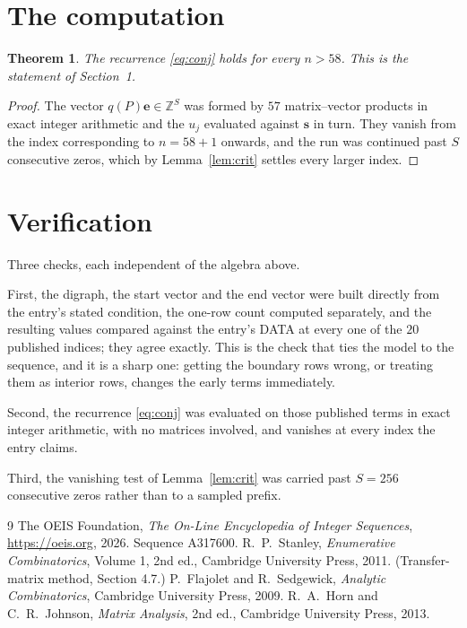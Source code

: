 \documentclass[11pt,a4paper]{article}
\theoremstyle{plain}
\newtheorem{theorem}{Theorem}
\theoremstyle{definition}
\begin{document}
\section{The computation}

\begin{theorem}
The recurrence \eqref{eq:conj} holds for every $n>58$. This is the statement of
Section~1.
\end{theorem}

\begin{proof}
The vector $q(P)\mathbf{e}\in\mathbb{Z}^{S}$ was formed by $57$ matrix--vector
products in exact integer arithmetic and the $u_j$ evaluated against $\mathbf{s}$ in turn.
They vanish from the index corresponding to $n=58+1$ onwards, and the run was continued
past $S$ consecutive zeros, which by Lemma~\ref{lem:crit} settles every larger index.
\end{proof}

\section{Verification}

Three checks, each independent of the algebra above.

First, the digraph, the start vector and the end vector were built directly from the
entry's stated condition, the one-row count computed separately, and the resulting values
compared against the entry's DATA at every one of the $20$ published indices; they
agree exactly. This is the check that ties the model to the sequence, and it is a sharp one:
getting the boundary rows wrong, or treating them as interior rows, changes the early terms
immediately.

Second, the recurrence \eqref{eq:conj} was evaluated on those published terms in exact
integer arithmetic, with no matrices involved, and vanishes at every index the entry claims.

Third, the vanishing test of Lemma~\ref{lem:crit} was carried past $S=256$ consecutive
zeros rather than to a sampled prefix.

\begin{thebibliography}{9}
 The OEIS Foundation, \emph{The On-Line Encyclopedia of Integer
Sequences}, \url{https://oeis.org}, 2026. Sequence A317600.
 R.~P.~Stanley, \emph{Enumerative Combinatorics}, Volume 1, 2nd ed.,
Cambridge University Press, 2011. (Transfer-matrix method, Section 4.7.)
 P.~Flajolet and R.~Sedgewick, \emph{Analytic Combinatorics}, Cambridge
University Press, 2009.
 R.~A.~Horn and C.~R.~Johnson, \emph{Matrix Analysis}, 2nd ed., Cambridge
University Press, 2013.
\end{thebibliography}
\end{document}
